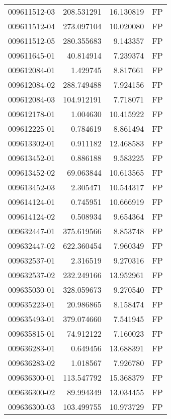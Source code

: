 \begin{tabular}{lrrl}
009611512-03 &  208.531291 &      16.130819 &   FP \\
009611512-04 &  273.097104 &      10.020080 &   FP \\
009611512-05 &  280.355683 &       9.143357 &   FP \\
009611645-01 &   40.814914 &       7.239374 &   FP \\
009612084-01 &    1.429745 &       8.817661 &   FP \\
009612084-02 &  288.749488 &       7.924156 &   FP \\
009612084-03 &  104.912191 &       7.718071 &   FP \\
009612178-01 &    1.004630 &      10.415922 &   FP \\
009612225-01 &    0.784619 &       8.861494 &   FP \\
009613302-01 &    0.911182 &      12.468583 &   FP \\
009613452-01 &    0.886188 &       9.583225 &   FP \\
009613452-02 &   69.063844 &      10.613565 &   FP \\
009613452-03 &    2.305471 &      10.544317 &   FP \\
009614124-01 &    0.745951 &      10.666919 &   FP \\
009614124-02 &    0.508934 &       9.654364 &   FP \\
009632447-01 &  375.619566 &       8.853748 &   FP \\
009632447-02 &  622.360454 &       7.960349 &   FP \\
009632537-01 &    2.316519 &       9.270316 &   FP \\
009632537-02 &  232.249166 &      13.952961 &   FP \\
009635030-01 &  328.059673 &       9.270540 &   FP \\
009635223-01 &   20.986865 &       8.158474 &   FP \\
009635493-01 &  379.074660 &       7.541945 &   FP \\
009635815-01 &   74.912122 &       7.160023 &   FP \\
009636283-01 &    0.649456 &      13.688391 &   FP \\
009636283-02 &    1.018567 &       7.926780 &   FP \\
009636300-01 &  113.547792 &      15.368379 &   FP \\
009636300-02 &   89.994349 &      13.034455 &   FP \\
009636300-03 &  103.499755 &      10.973729 &   FP \\

\end{tabular}
